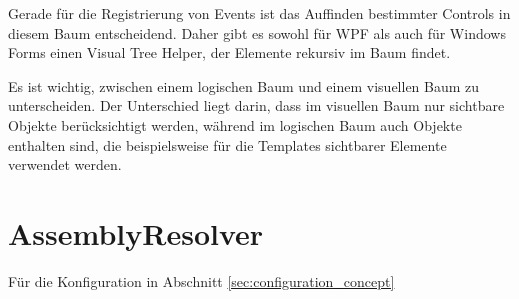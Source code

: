 Gerade für die Registrierung von Events ist das Auffinden bestimmter Controls in diesem Baum entscheidend. Daher gibt es sowohl für WPF als auch für Windows Forms einen Visual Tree Helper, der Elemente rekursiv im Baum findet.

Es ist wichtig, zwischen einem logischen Baum und einem visuellen Baum zu unterscheiden. Der Unterschied liegt darin, dass im visuellen Baum nur sichtbare Objekte berücksichtigt werden, während im logischen Baum auch Objekte enthalten sind, die beispielsweise für die Templates sichtbarer Elemente verwendet werden.

\section{AssemblyResolver}
Für die Konfiguration in Abschnitt \ref{sec:configuration_concept} 